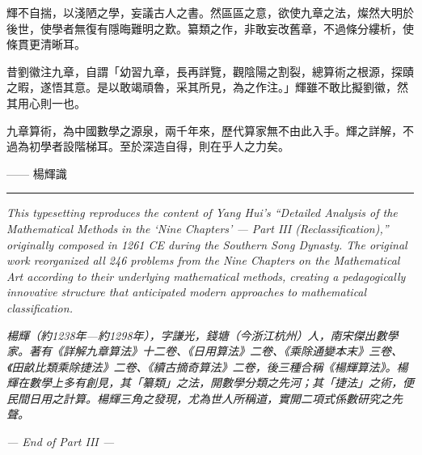 \documentclass[11pt,a4paper]{article}
\newcommand{\longline}{\noindent\rule{\textwidth}{0.4pt}}
\begin{document}
輝不自揣，以淺陋之學，妄議古人之書。然區區之意，欲使九章之法，燦然大明於後世，使學者無復有隱晦難明之歎。纂類之作，非敢妄改舊章，不過條分縷析，使條貫更清晰耳。

昔劉徽注九章，自謂「幼習九章，長再詳覽，觀陰陽之割裂，總算術之根源，探賾之暇，遂悟其意。是以敢竭頑魯，采其所見，為之作注。」輝雖不敢比擬劉徽，然其用心則一也。

九章算術，為中國數學之源泉，兩千年來，歷代算家無不由此入手。輝之詳解，不過為初學者設階梯耳。至於深造自得，則在乎人之力矣。

\begin{flushright}
—— 楊輝識
\end{flushright}

\medskip
\longline

\vspace{1cm}

\noindent\textit{This typesetting reproduces the content of Yang Hui's ``Detailed Analysis of the Mathematical Methods in the `Nine Chapters' --- Part III (Reclassification),'' originally composed in 1261 CE during the Southern Song Dynasty. The original work reorganized all 246 problems from the \textit{Nine Chapters on the Mathematical Art} according to their underlying mathematical methods, creating a pedagogically innovative structure that anticipated modern approaches to mathematical classification.}

\vspace{0.5cm}

\noindent\textit{楊輝（約1238年—約1298年），字謙光，錢塘（今浙江杭州）人，南宋傑出數學家。著有《詳解九章算法》十二卷、《日用算法》二卷、《乘除通變本末》三卷、《田畝比類乘除捷法》二卷、《續古摘奇算法》二卷，後三種合稱《楊輝算法》。楊輝在數學上多有創見，其「纂類」之法，開數學分類之先河；其「捷法」之術，便民間日用之計算。楊輝三角之發現，尤為世人所稱道，實開二項式係數研究之先聲。}

\vspace{1cm}

\begin{flushright}
\textit{--- End of Part III ---}
\end{flushright}
\end{document}

